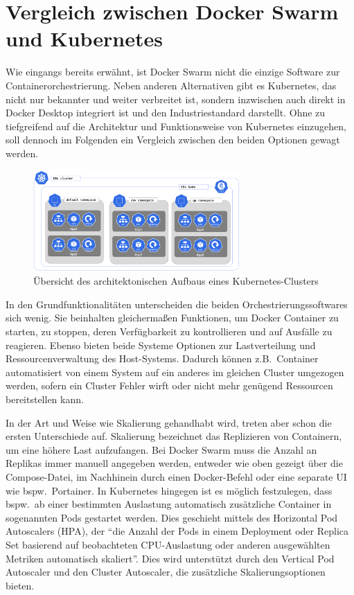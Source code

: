 \chapter{Vergleich zwischen Docker Swarm und Kubernetes}\label{ch:comparison}

Wie eingangs bereits erw\"ahnt, ist Docker Swarm nicht die einzige Software zur Containerorchestrierung.
Neben anderen Alternativen gibt es Kubernetes, das nicht nur bekannter und weiter verbreitet ist, sondern inzwischen auch direkt in Docker Desktop integriert ist und den Industriestandard darstellt. 
Ohne zu tiefgreifend auf die Architektur und Funktionsweise von Kubernetes einzugehen, soll dennoch im Folgenden ein Vergleich zwischen den beiden Optionen gewagt werden.

\begin{figure}[h]
    \centering
    \includegraphics[width=0.7\textwidth]{figures/kubernetes.png}
    \caption{\"Ubersicht des architektonischen Aufbaus eines Kubernetes-Clusters\cite{kumar_working_2019}}
    \label{fig:k8s-cluster}
\end{figure}

In den Grundfunktionalit\"aten unterscheiden die beiden Orchestrierungssoftwares sich wenig. 
Sie beinhalten gleicherma{\ss}en Funktionen, um Docker Container zu starten, zu stoppen, deren Verf\"ugbarkeit zu kontrollieren und auf Ausf\"alle zu reagieren. 
Ebenso bieten beide Systeme Optionen zur Lastverteilung und Ressourcenverwaltung des Host-Systems. 
Dadurch k\"onnen z.B.\ Container automatisiert von einem System auf ein anderes im gleichen Cluster umgezogen werden, sofern ein Cluster Fehler wirft oder nicht mehr gen\"ugend Ressourcen bereitstellen kann. 

In der Art und Weise wie Skalierung gehandhabt wird, treten aber schon die ersten Unterschiede auf. 
Skalierung bezeichnet das Replizieren von Containern, um eine h\"ohere Last aufzufangen.
Bei Docker Swarm muss die Anzahl an Replikas immer manuell angegeben werden, entweder wie oben gezeigt \"uber die Compose-Datei, im Nachhinein durch einen Docker-Befehl oder eine separate UI wie bspw.\ Portainer. 
In Kubernetes hingegen ist es m\"oglich festzulegen, dass bspw.\ ab einer bestimmten Auslastung automatisch zus\"atzliche Container in sogenannten Pods gestartet werden. 
Dies geschieht mittels des Horizontal Pod Autoscalers (HPA), der ``die Anzahl der Pods in einem Deployment oder Replica Set basierend auf beobachteten CPU-Auslastung oder anderen ausgewählten Metriken automatisch skaliert''.\cite{briegel_kubernetes_2023}
Dies wird unterst\"utzt durch den Vertical Pod Autoscaler und den Cluster Autoscaler, die zus\"atzliche Skalierungsoptionen bieten.\cite{briegel_kubernetes_2023}

